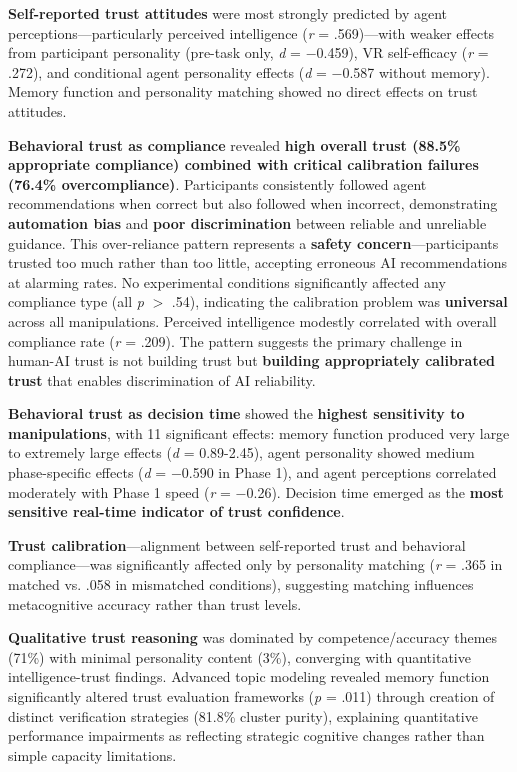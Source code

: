 \documentclass[12pt]{article}
\begin{document}
\textbf{Self-reported trust attitudes} were most strongly predicted by agent perceptions—particularly perceived intelligence (\textit{r} = .569)—with weaker effects from participant personality (pre-task only, \textit{d} = $-$0.459), VR self-efficacy (\textit{r} = .272), and conditional agent personality effects (\textit{d} = $-$0.587 without memory). Memory function and personality matching showed no direct effects on trust attitudes.

\textbf{Behavioral trust as compliance} revealed \textbf{high overall trust (88.5\% appropriate compliance) combined with critical calibration failures (76.4\% overcompliance)}. Participants consistently followed agent recommendations when correct but also followed when incorrect, demonstrating \textbf{automation bias} and \textbf{poor discrimination} between reliable and unreliable guidance. This over-reliance pattern represents a \textbf{safety concern}---participants trusted too much rather than too little, accepting erroneous AI recommendations at alarming rates. No experimental conditions significantly affected any compliance type (all \textit{p} $>$ .54), indicating the calibration problem was \textbf{universal} across all manipulations. Perceived intelligence modestly correlated with overall compliance rate (\textit{r} = .209). The pattern suggests the primary challenge in human-AI trust is not building trust but \textbf{building appropriately calibrated trust} that enables discrimination of AI reliability.

\textbf{Behavioral trust as decision time} showed the \textbf{highest sensitivity to manipulations}, with 11 significant effects: memory function produced very large to extremely large effects (\textit{d} = 0.89-2.45), agent personality showed medium phase-specific effects (\textit{d} = $-$0.590 in Phase 1), and agent perceptions correlated moderately with Phase 1 speed (\textit{r} = $-$0.26). Decision time emerged as the \textbf{most sensitive real-time indicator of trust confidence}.

\textbf{Trust calibration}---alignment between self-reported trust and behavioral compliance---was significantly affected only by personality matching (\textit{r} = .365 in matched vs. .058 in mismatched conditions), suggesting matching influences metacognitive accuracy rather than trust levels.

\textbf{Qualitative trust reasoning} was dominated by competence/accuracy themes (71\%) with minimal personality content (3\%), converging with quantitative intelligence-trust findings. Advanced topic modeling revealed memory function significantly altered trust evaluation frameworks (\textit{p} = .011) through creation of distinct verification strategies (81.8\% cluster purity), explaining quantitative performance impairments as reflecting strategic cognitive changes rather than simple capacity limitations.
\end{document}
